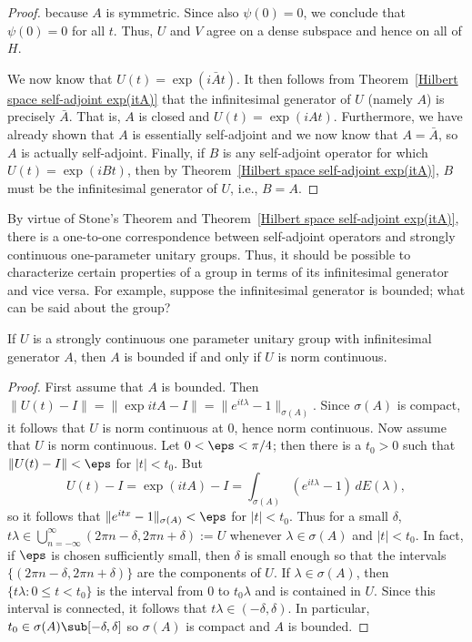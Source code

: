 \begin{proof}
because $A$ is symmetric. Since also $\psi(0)=0$, we conclude that $\psi(0)=0$ for all $t$. Thus, $U$ and $V$ agree on a dense subspace and hence on all of $H$.\par
We now know that $U(t)=\exp(i\bar{A}t)$. It then follows from Theorem~\ref{Hilbert space self-adjoint exp(itA)} that the infinitesimal generator of $U$ (namely $A$) is precisely $\bar{A}$. That is, $A$ is closed and $U(t)=\exp(iAt)$. Furthermore, we have already shown that $A$ is essentially self-adjoint and we now know that $A=\bar{A}$, so $A$ is actually self-adjoint. Finally, if $B$ is any self-adjoint operator for which $U(t)=\exp(iBt)$, then by Theorem~\ref{Hilbert space self-adjoint exp(itA)}, $B$ must be the infinitesimal generator of $U$, i.e., $B=A$.
\end{proof}
By virtue of Stone's Theorem and Theorem~\ref{Hilbert space self-adjoint exp(itA)}, there is a one-to-one correspondence between self-adjoint operators and strongly continuous one-parameter unitary groups. Thus, it should be possible to characterize certain properties of a group in terms of its infinitesimal generator and vice versa. For example, suppose the infinitesimal generator is bounded; what can be said about the group?
\begin{proposition}\label{Hilbert space 1-parameter group bounded iff}
If $U$ is a strongly continuous one parameter unitary group with infinitesimal generator $A$, then $A$ is bounded if and only if $U$ is norm continuous.
\end{proposition}
\begin{proof}
First assume that $A$ is bounded. Then $\|U(t)-I\|=\|\exp{itA}-I\|=\|e^{it\lambda}-1\|_{\sigma(A)}$. Since $\sigma(A)$ is compact, it follows that $U$ is norm continuous at $0$, hence norm continuous.
Now assume that $U$ is norm continuous. Let $0<\eps<\pi/4$; then there is a $t_0>0$ such that $\|U(t)-I\|<\eps$ for $|t|<t_0$. But
\[U(t)-I=\exp(itA)-I=\int_{\sigma(A)}(e^{it\lambda}-1)\,dE(\lambda),\]
so it follows that $\|e^{itx}-1\|_{\sigma(A)}<\eps$ for $|t|<t_0$. Thus for a small $\delta$, $t\lambda\in \bigcup_{n=-\infty}^{\infty}(2\pi n-\delta,2\pi n+\delta):=U$ whenever $\lambda\in\sigma(A)$ and $|t|<t_0$. In fact, if $\eps$ is chosen sufficiently small, then $\delta$ is small enough so that the intervals $\{(2\pi n-\delta,2\pi n+\delta)\}$ are the components of $U$. If $\lambda\in\sigma(A)$, then $\{t\lambda:0\leq t<t_0\}$ is the interval from $0$ to $t_0\lambda$ and is contained in $U$. Since this interval is connected, it follows that $t\lambda\in(-\delta,\delta)$. In particular, $t_0\in\sigma(A)\sub[-\delta,\delta]$ so $\sigma(A)$ is compact and $A$ is bounded.
\end{proof}

